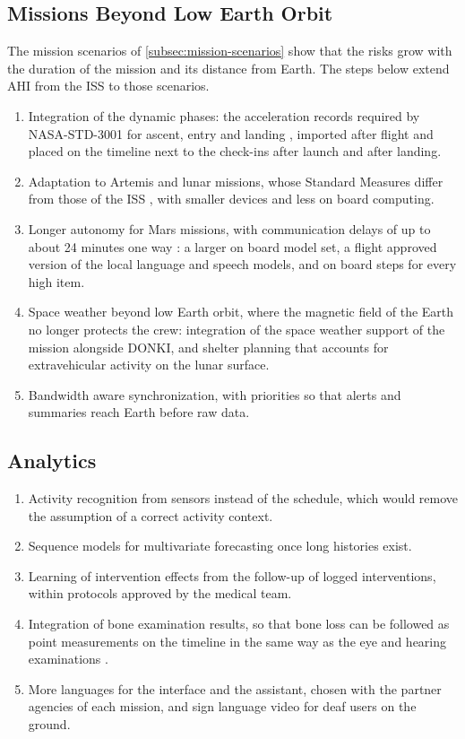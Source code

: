 \subsection{Missions Beyond Low Earth Orbit}
\label{subsec:future-platform}

The mission scenarios of \ref{subsec:mission-scenarios} show that the risks grow with the duration of the mission and its distance from Earth. The steps below extend AHI from the ISS to those scenarios.

\begin{enumerate}
\item Integration of the dynamic phases: the acceleration records required by NASA-STD-3001 for ascent, entry and landing \cite{nasa_ochmo_tb024_occupant}, imported after flight and placed on the timeline next to the check-ins after launch and after landing.
\item Adaptation to Artemis and lunar missions, whose Standard Measures differ from those of the ISS \cite{nasa_artemis_ii_standard_measures}, with smaller devices and less on board computing.
\item Longer autonomy for Mars missions, with communication delays of up to about 24 minutes one way \cite{nasa_space_communications_seven_things}: a larger on board model set, a flight approved version of the local language and speech models, and on board steps for every high item.
\item Space weather beyond low Earth orbit, where the magnetic field of the Earth no longer protects the crew: integration of the space weather support of the mission alongside DONKI, and shelter planning that accounts for extravehicular activity on the lunar surface.
\item Bandwidth aware synchronization, with priorities so that alerts and summaries reach Earth before raw data.
\end{enumerate}

\subsection{Analytics}
\label{subsec:future-analytics}

\begin{enumerate}
\item Activity recognition from sensors instead of the schedule, which would remove the assumption of a correct activity context.
\item Sequence models for multivariate forecasting once long histories exist.
\item Learning of intervention effects from the follow-up of logged interventions, within protocols approved by the medical team.
\item Integration of bone examination results, so that bone loss can be followed as point measurements on the timeline in the same way as the eye and hearing examinations \cite{lang2004bone}.
\item More languages for the interface and the assistant, chosen with the partner agencies of each mission, and sign language video for deaf users on the ground.
\end{enumerate}

